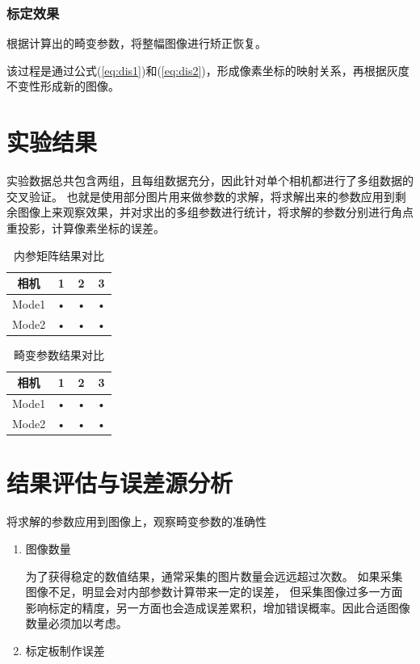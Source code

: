 \documentclass[UTF8]{ctexart}
\begin{document}
\begin{CJK*}{UTF8}{gbsn}
\subsubsection{标定效果}
根据计算出的畸变参数，将整幅图像进行矫正恢复。

该过程是通过公式(\ref{eq:dis1})和(\ref{eq:dis2})，形成像素坐标的映射关系，再根据灰度不变性形成新的图像。


\section{实验结果}
实验数据总共包含两组，且每组数据充分，因此针对单个相机都进行了多组数据的交叉验证。
也就是使用部分图片用来做参数的求解，将求解出来的参数应用到剩余图像上来观察效果，并对求出的多组参数进行统计，将求解的参数分别进行角点重投影，计算像素坐标的误差。

\begin{table}[htbp]
\centering
\caption{内参矩阵结果对比}
	\begin{tabular}{|c|c|c|c|}
	\hline 
	相机 & 1 & 2 & 3 \\ 
	\hline 
	Mode1 & • & • & • \\ 
	\hline 
	Mode2 & • & • & • \\ 
	\hline 
	\end{tabular} 
\end{table}

\begin{table}[htbp]
    \centering
    \caption{畸变参数结果对比}
        \begin{tabular}{|c|c|c|c|}
        \hline 
        相机 & 1 & 2 & 3 \\ 
        \hline 
        Mode1 & • & • & • \\ 
        \hline 
        Mode2 & • & • & • \\ 
        \hline 
        \end{tabular} 
    \end{table}

\section{结果评估与误差源分析}
将求解的参数应用到图像上，观察畸变参数的准确性

\begin{enumerate}[(1)]
    \item 图像数量
    
    为了获得稳定的数值结果，通常采集的图片数量会远远超过次数。
    如果采集图像不足，明显会对内部参数计算带来一定的误差，
    但采集图像过多一方面影响标定的精度，另一方面也会造成误差累积，增加错误概率。因此合适图像数量必须加以考虑。
    \item 标定板制作误差
    

\end{enumerate}
\end{CJK*}
\end{document}
